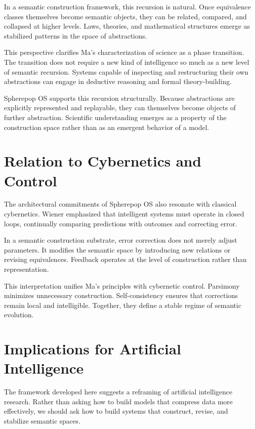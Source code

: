 \documentclass[11pt]{article}
\begin{document}
In a semantic construction framework, this recursion is natural. Once
equivalence classes themselves become semantic objects, they can be
related, compared, and collapsed at higher levels. Laws, theories, and
mathematical structures emerge as stabilized patterns in the space of
abstractions.

This perspective clarifies Ma’s characterization of science as a phase
transition. The transition does not require a new kind of intelligence so
much as a new level of semantic recursion. Systems capable of inspecting
and restructuring their own abstractions can engage in deductive reasoning
and formal theory-building.

Spherepop OS supports this recursion structurally. Because abstractions are
explicitly represented and replayable, they can themselves become objects
of further abstraction. Scientific understanding emerges as a property of
the construction space rather than as an emergent behavior of a model.

\section{Relation to Cybernetics and Control}

The architectural commitments of Spherepop OS also resonate with classical
cybernetics. Wiener emphasized that intelligent systems must operate in
closed loops, continually comparing predictions with outcomes and
correcting error.

In a semantic construction substrate, error correction does not merely
adjust parameters. It modifies the semantic space by introducing new
relations or revising equivalences. Feedback operates at the level of
construction rather than representation.

This interpretation unifies Ma’s principles with cybernetic control.
Parsimony minimizes unnecessary construction. Self-consistency ensures
that corrections remain local and intelligible. Together, they define a
stable regime of semantic evolution.

\section{Implications for Artificial Intelligence}

The framework developed here suggests a reframing of artificial
intelligence research. Rather than asking how to build models that compress
data more effectively, we should ask how to build systems that construct,
revise, and stabilize semantic spaces.
\end{document}
